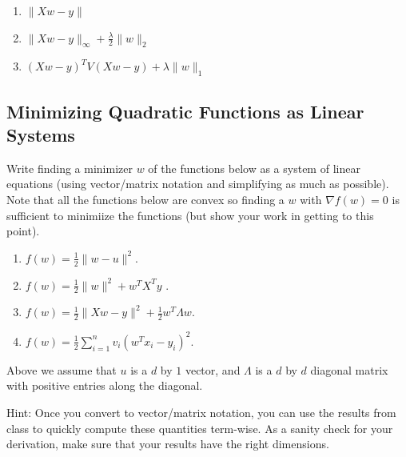 \documentclass{article}
\def\blu#1{{\color{blu}#1}}
\def\norm#1{\|#1\|}
\def\enum#1{\begin{enumerate}#1\end{enumerate}}
\begin{document}
\begin{enumerate}
     \item  $ \norm{Xw-y}$
    \item  $ \norm{Xw-y}_\infty +   \frac{\lambda}{2}\norm{w}_2$
    \item  $ (Xw-y)^T V(Xw-y) +   \lambda\norm{w}_1$
 
\end{enumerate}


\subsection{Minimizing Quadratic Functions as Linear Systems}

Write finding a minimizer $w$ of the functions below as a system of linear equations (using vector/matrix notation and simplifying as much as possible). Note that all the functions below are convex  so finding a $w$ with $\nabla f(w) = 0$ is sufficient to minimiize the functions (but show your work in getting to this point).
\blu{\enum{
\item $f(w) = \frac{1}{2}\norm{w-u}^2$.
\item $f(w) = \frac{1}{2}\norm{w}^2 + w^TX^Ty$ .
\item $f(w)= \frac{1}{2}\norm{Xw - y}^2 + \frac{1}{2}w^T\Lambda w$.
\item $f(w) = \frac{1}{2}\sum_{i=1}^n v_i (w^Tx_i - y_i)^2$.
}}
Above we assume that $u$ is a $d$ by $1$ vector, and $\Lambda$ is a $d$ by $d$ diagonal matrix with positive entries along the diagonal.

Hint: Once you convert to vector/matrix notation, you can use the results from class to quickly compute these quantities term-wise. As a sanity check for your derivation, make sure that your results have the right dimensions.
\end{document}
